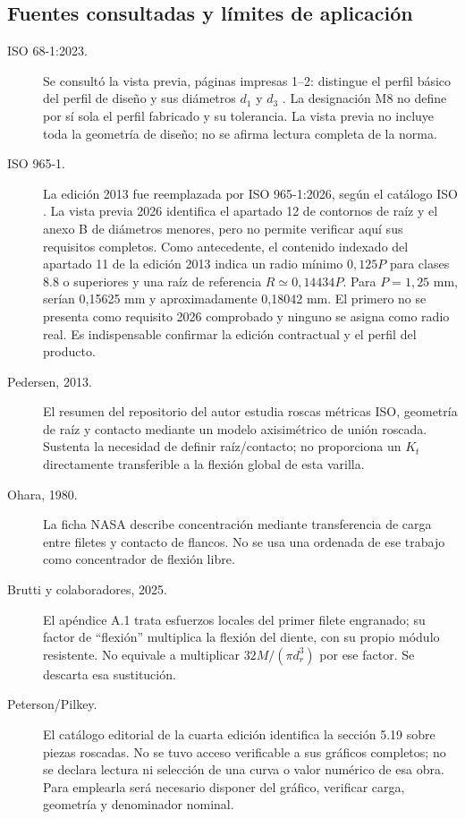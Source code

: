 \subsection{Fuentes consultadas y límites de aplicación}
\begin{description}
\item[ISO 68-1:2023.]
Se consultó la vista previa, páginas impresas 1--2: distingue el perfil
básico del perfil de diseño y sus diámetros $d_1$ y $d_3$
\cite{iso68_2023_vista_Kt}. La designación M8 no define por sí sola el
perfil fabricado y su tolerancia. La vista previa no incluye toda la
geometría de diseño; no se afirma lectura completa de la norma.
\item[ISO 965-1.]
La edición 2013 fue reemplazada por ISO 965-1:2026, según el catálogo ISO
\cite{iso965_2026_estado_Kt}. La vista previa 2026 identifica el apartado
12 de contornos de raíz y el anexo B de diámetros menores, pero no permite
verificar aquí sus requisitos completos. Como antecedente, el contenido
indexado del apartado 11 de la edición 2013 indica un radio mínimo
$0,125P$ para clases 8.8 o superiores y una raíz de referencia
$R\simeq0,14434P$\cite{iso965_2013_antecedente_Kt}.
Para $P=1,25$ mm, serían 0,15625 mm y aproximadamente 0,18042 mm.
El primero no se presenta como requisito 2026 comprobado y ninguno
se asigna como radio real. Es indispensable confirmar la edición
contractual y el perfil del producto.
\item[Pedersen, 2013.]
El resumen del repositorio del autor estudia roscas métricas ISO,
geometría de raíz y contacto mediante un modelo axisimétrico de unión
roscada\cite{pedersen_2013_roscas}. Sustenta la necesidad de definir
raíz/contacto; no proporciona un $K_t$ directamente transferible a la
flexión global de esta varilla.
\item[Ohara, 1980.]
La ficha NASA describe concentración mediante transferencia de carga
entre filetes y contacto de flancos\cite{ohara_1980_roscas}.
No se usa una ordenada de ese trabajo como concentrador de flexión libre.
\item[Brutti y colaboradores, 2025.]
El apéndice A.1 trata esfuerzos locales del primer filete engranado;
su factor de ``flexión'' multiplica la flexión del diente, con su propio
módulo resistente\cite{brutti_2025_roscas}. No equivale a multiplicar
$32M/(\pi d_r^3)$ por ese factor. Se descarta esa sustitución.
\item[Peterson/Pilkey.]
El catálogo editorial de la cuarta edición identifica la sección 5.19
sobre piezas roscadas\cite{peterson_2020_catalogo_Kt}. No se tuvo acceso
verificable a sus gráficos completos; no se declara lectura ni selección
de una curva o valor numérico de esa obra. Para emplearla será necesario
disponer del gráfico, verificar carga, geometría y denominador nominal.
\end{description}

